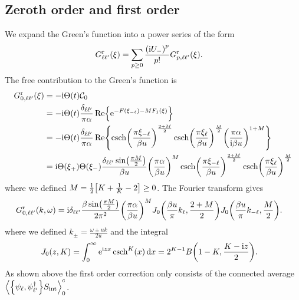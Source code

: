 \documentclass[english, parskip=full]{scrartcl}
\begin{document}
\subsection{Zeroth order and first order}
We expand the Green's function into a power series of the form
\begin{align}
G_{\ell\ell'}^\r(\xi) &= \sum_{p\ge 0} \frac{\kla*{\i U_-}^p}{p!} G_{p,\ell\ell'}^\r(\xi).
\end{align}
The free contribution to the Green's function is
\begin{align}
G_{0,\ell\ell'}^\r(\xi) &= -\i\Theta(t) \mathcal{C}_0\\
&= -\i\Theta(t) \frac{\delta_{\ell\ell'}}{\pi\alpha} \Re \klc*{\powe{-F(\xi_{-\ell}) - MF_1(\xi)}}\\
&= -\i\Theta(t) \frac{\delta_{\ell\ell'}}{\pi\alpha} \Re \klc*{\csch\kla*{\frac{\pi\xi_{-\ell}}{\beta u}}^\frac{2+M}{2} \csch\kla*{\frac{\pi\xi_\ell}{\beta u}}^\frac{M}{2} \kla*{\frac{\pi\alpha}{\i\beta u}}^{1+M}}\\
&= \i\Theta(\xi_+)\Theta(\xi_-) \frac{\delta_{\ell\ell'} \sin\kla*{\frac{\pi M}{2}}}{\beta u} \kla*{\frac{\pi\alpha}{\beta u}}^{M} \csch\kla*{\frac{\pi\xi_{-\ell}}{\beta u}}^\frac{2+M}{2} \csch\kla*{\frac{\pi\xi_\ell}{\beta u}}^\frac{M}{2}
\end{align}
where we defined $M = \frac{1}{2} \klb*{K + \frac{1}{K} - 2}\ge 0$.
The Fourier transform gives
\begin{align}
G_{0,\ell\ell'}^\r(k,\omega) &= \i \delta_{\ell\ell'} \frac{\beta \sin\kla*{\frac{\pi M}{2}}}{2\pi^2} \kla*{\frac{\pi\alpha}{\beta u}}^{M} J_0\kla*{\frac{\beta u}{\pi} k_\ell, \frac{2 + M}{2}} J_0\kla*{\frac{\beta u}{\pi} k_{-\ell}, \frac{M}{2}}.
\end{align}
where we defined $k_\pm = \frac{\omega \pm uk}{2u}$ and the integral
\begin{align}
J_0(z,K) &= \intx{0}{\infty}{\powe{\i zx} \csch^K(x)}{x} = 2^{K-1} B\kla*{1 - K, \frac{K - \i z}{2}}.
\end{align}
As shown above the first order correction only consists of the connected average $\bra*{\klc*{\psi_\ell, \psi_{\ell'}^\dagger} S_\Text{int}}_0^c$.
\end{document}
